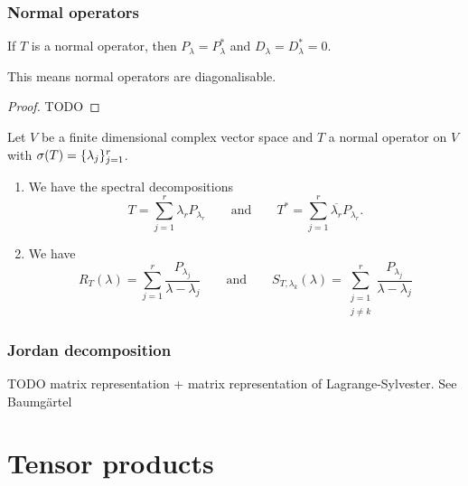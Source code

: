 \subsubsection{Normal operators}


\begin{proposition}
If $T$ is a normal operator, then $P_\lambda = P^*_\lambda$ and $D_\lambda = D^*_\lambda = 0$.
\end{proposition}
This means normal operators are diagonalisable.
\begin{proof}
TODO
\end{proof}
\begin{corollary}
Let $V$ be a finite dimensional complex vector space and $T$ a normal operator
on $V$ with $\sigma(T) = \{\lambda_j\}_{j=1}^r$.
\begin{enumerate}
\item We have the spectral decompositions
\[ T = \sum_{j=1}^r \lambda_r P_{\lambda_r} \qquad\text{and}\qquad T^* = \sum_{j=1}^r \overline{\lambda_r} P_{\lambda_r}. \]
\item We have
\[ R_T(\lambda) = \sum_{j = 1}^r \frac{P_{\lambda_j}}{\lambda - \lambda_j} \qquad \text{and} \qquad S_{T,\lambda_k}(\lambda) = \sum_{\substack{j = 1 \\ j\neq k}}^r \frac{P_{\lambda_j}}{\lambda - \lambda_j} \]
\end{enumerate}
\end{corollary}

\subsubsection{Jordan decomposition}
TODO matrix representation + matrix representation of Lagrange-Sylvester. See Baumgärtel



\section{Tensor products}
